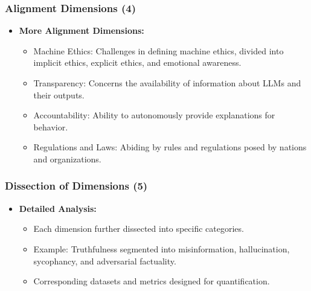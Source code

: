 \begin{frame}[fragile]\frametitle{Alignment Dimensions (4)}
  \begin{itemize}
    \item \textbf{More Alignment Dimensions:}
      \begin{itemize}
        \item Machine Ethics: Challenges in defining machine ethics, divided into implicit ethics, explicit ethics, and emotional awareness.
        \item Transparency: Concerns the availability of information about LLMs and their outputs.
        \item Accountability: Ability to autonomously provide explanations for behavior.
        \item Regulations and Laws: Abiding by rules and regulations posed by nations and organizations.
      \end{itemize}
  \end{itemize}
\end{frame}

\begin{frame}[fragile]\frametitle{Dissection of Dimensions (5)}
  \begin{itemize}
    \item \textbf{Detailed Analysis:}
      \begin{itemize}
        \item Each dimension further dissected into specific categories.
        \item Example: Truthfulness segmented into misinformation, hallucination, sycophancy, and adversarial factuality.
        \item Corresponding datasets and metrics designed for quantification.
      \end{itemize}
  \end{itemize}
\end{frame}


